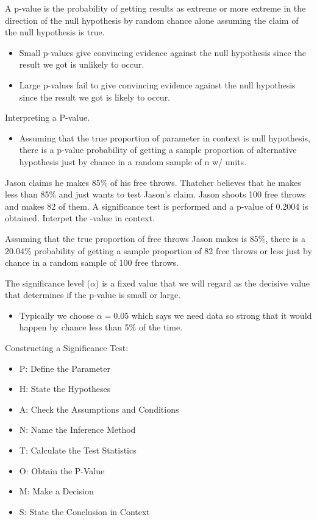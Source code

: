 \documentclass[../stats.tex]{subfiles}
\begin{document}
A p-value is the probability of getting results as extreme or more extreme in the direction of the null hypothesis by random chance alone assuming the claim of the null hypothesis is true.
\begin{itemize}
    \item Small p-values give convincing evidence against the null hypothesis since the result we got is unlikely to occur.
    \item Large p-values fail to give convincing evidence against the null hypothesis since the result we got is likely to occur.
\end{itemize}
Interpreting a P-value.
\begin{itemize}
    \item Assuming that the true proportion of {parameter in context} is {null hypothesis}, there is a {p-value} probability of getting a sample proportion of {alternative hypothesis} just by chance in a random sample of {n w/ units}.
\end{itemize}
\medbreak
\begin{example}
    Jason claims he makes 85\% of his free throws. Thatcher believes that he makes less than 85\% and just wants to test Jason's claim. Jason shoots 100 free throws and makes 82 of them. A significance test is performed and a p-value of 0.2004 is obtained. Interpet the -value in context.

    Assuming that the true proportion of free throws Jason makes is 85\%, there is a 20.04\% probability of getting a sample proportion of 82 free throws or less just by chance in a random sample of 100 free throws.
\end{example}

The significance level ($\alpha$) is a fixed value that we will regard as the decisive value that determines if the p-value is small or large.
\begin{itemize}
    \item Typically we choose $\alpha=0.05$ which says we need data so strong that it would happen by chance less than 5\% of the time.
\end{itemize}

Constructing a Significance Test:
\begin{itemize}
    \item P: Define the Parameter 
    \item H: State the Hypotheses
    \item A: Check the Assumptions and Conditions 
    \item N: Name the Inference Method 
    \item T: Calculate the Test Statistics
    \item O: Obtain the P-Value 
    \item M: Make a Decision 
    \item S: State the Conclusion in Context 
\end{itemize}
\end{document}
